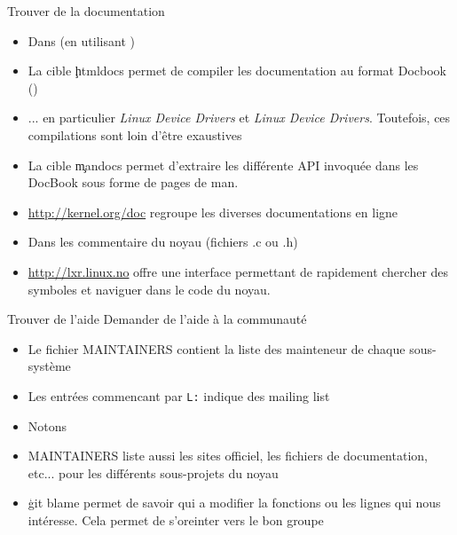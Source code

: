 \begin{frame}[fragile=singleslide]{Trouver de la documentation}
  \begin{itemize} 
  \item Dans  (en utilisant )
  \item La cible \c{htmldocs}  permet de compiler les documentation au
    format Docbook ()
  \item ... en particulier  \emph{Linux Device Drivers} et \emph{Linux
      Device  Drivers}. Toutefois, ces  compilations sont  loin d'être
    exaustives
  \item  La cible  \c{mandocs}  permet d'extraire  les différente  API
    invoquée dans les DocBook sous forme de pages de man.
  \item    \url{http://kernel.org/doc}     regroupe    les    diverses
    documentations en ligne
  \item Dans les commentaire du noyau (fichiers .c ou .h)
  \item  \url{http://lxr.linux.no} offre  une interface  permettant de
    rapidement  chercher des  symboles  et naviguer  dans  le code  du
    noyau.
  \end{itemize}
\end{frame}

\begin{frame}[fragile=singleslide]{Trouver de l'aide}
Demander de l'aide à la communauté
    \begin{itemize}
    \item Le  fichier MAINTAINERS contient la liste  des mainteneur de
      chaque sous-système
    \item Les entrées commencant par \texttt{L:} indique des mailing
      list
    \item Notons 
    \item MAINTAINERS  liste aussi les sites  officiel, les fichiers
      de documentation, etc...   pour les différents sous-projets du
      noyau
    \item \c{git blame} permet de savoir qui a modifier la fonctions
      ou les  lignes qui nous  intéresse. Cela permet  de s'oreinter
      vers le bon groupe
    \end{itemize}
\end{frame} 

